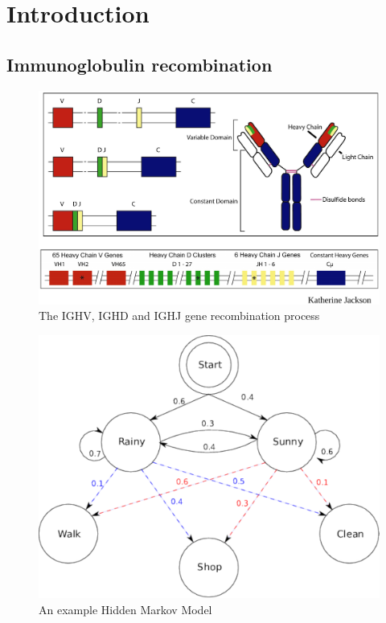 \chapter{Introduction}

\section{Immunoglobulin recombination}

\begin{figure}
  \includegraphics[width=\textwidth]{rearrangement.pdf}
  \caption{The IGHV, IGHD and IGHJ gene recombination process}
  \label{fig:combination}
\end{figure}
\begin{figure}
  \centering
  \includegraphics[width=12cm]{hmm-graph.pdf}
  \caption{An example Hidden Markov Model \autocite{wiki-hmm}}
  \label{fig:hmm}
\end{figure}

